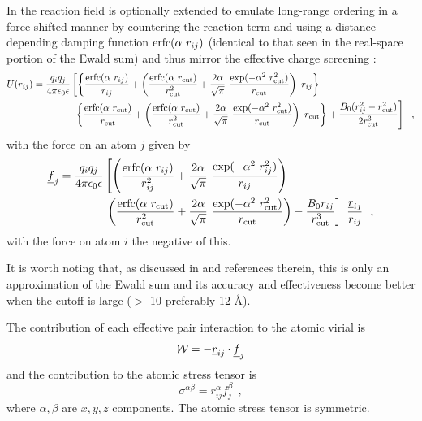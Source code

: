 In \D the reaction field is optionally extended to emulate
long-range ordering in a force-shifted manner by countering
the reaction term and using a distance depending damping
function ${\rm erfc}(\alpha~r_{ij})$ (identical to that seen in
the real-space portion of the Ewald sum) and thus mirror the
effective charge screening \cite{fennell-06a}:
\begin{eqnarray}
U(r_{ij}) = {q_{i} q_{j} \over 4\pi\epsilon_{0}\epsilon} \left[
\left\{ \frac{{\rm erfc}(\alpha~r_{ij})}{r_{ij}} + \left(\frac{{\rm erfc}(\alpha~r_{\rm cut})}{r_{\rm cut}^{2}}+
\frac{2\alpha}{\sqrt{\pi}}~\frac{\exp(-\alpha^{2}~r_{\rm cut}^{2})}{r_{\rm cut}}\right)~r_{ij}\right\} - \phantom{xxxxxxxxxxxxxxx} \right. \\
\left. \phantom{xxxxxxxxxxxx} \left\{ \frac{{\rm erfc}(\alpha~r_{\rm cut})}{r_{\rm cut}} + \left(\frac{{\rm erfc}(\alpha~r_{\rm cut})}{r_{\rm cut}^{2}}+
\frac{2\alpha}{\sqrt{\pi}}~\frac{\exp(-\alpha^{2}~r_{\rm cut}^{2})}{r_{\rm cut}}\right)~r_{\rm cut}\right\} +
\frac{B_{0}(r_{ij}^{2}-r_{\rm cut}^{2})}{2 r_{\rm cut}^{3}} \right]~~, \nonumber
\end{eqnarray}
with the force on an atom $j$ given by
\begin{eqnarray}
\mbox{$\underline{f}$}_{j} = {q_{i} q_{j} \over 4\pi\epsilon_{0}\epsilon} \left[ \left( \frac{{\rm erfc}(\alpha~r_{ij})}{r_{ij}^{2}} +
\frac{2\alpha}{\sqrt{\pi}}~\frac{\exp(-\alpha^{2}~r_{ij}^{2})}{r_{ij}} \right) - \phantom{xxxxxxxxxxx} \right. \\
\left. \left( \frac{{\rm erfc}(\alpha~r_{\rm cut})}{r_{\rm cut}^{2}} +
\frac{2\alpha}{\sqrt{\pi}}~\frac{\exp(-\alpha^{2}~r_{\rm cut}^{2})}{r_{\rm cut}} \right) -
\frac{B_{0}r_{ij}}{r_{\rm cut}^{3}} \right]~\frac{\mbox{$\underline{r}$}_{ij}}{r_{ij}}~~, \nonumber
\end{eqnarray}
with the force on atom $i$ the negative of this.

It is worth noting that, as discussed in \cite{fennell-06a} and
references therein, this is only an approximation of the Ewald
sum and its accuracy and effectiveness become better when the
cutoff is large ($>$ 10 preferably 12 \AA).

The contribution of each effective pair interaction to the atomic
virial is
\begin{equation}
{\cal W} = -\mbox{$\underline{r}$}_{ij} \cdot \mbox{$\underline{f}$}_{j}
\end{equation}
and the contribution to the atomic stress tensor is
\begin{equation}
\sigma^{\alpha \beta} = r_{ij}^{\alpha} f_{j}^{\beta}~~,
\end{equation}
where $\alpha,\beta$ are $x,y,z$ components.  The atomic stress
tensor is symmetric.


